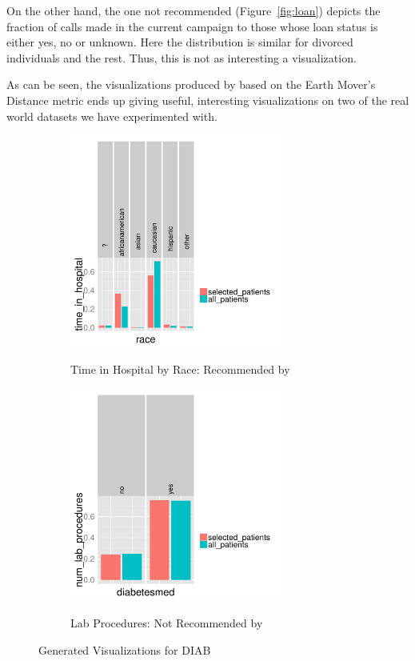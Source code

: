 On the other hand, the one not recommended (Figure~\ref{fig:loan})
depicts the fraction of calls made in the current campaign to those
whose loan status is either yes, no or unknown. 
Here the distribution is similar for divorced individuals and the rest.
Thus, this is not as interesting a visualization.

As can be seen, 
the visualizations produced by \SeeDB based on the Earth Mover's Distance
metric ends up giving useful, interesting visualizations on two of
the real world datasets we have experimented with.



\begin{figure}[h] 
\centering
\begin{subfigure}{\linewidth}
\centering
{\includegraphics[width=7cm] {Images/seedb_dim_race_measure_time_in_hospital.pdf}}
\caption{Time in Hospital by Race: Recommended by \SeeDB}
\label{fig:time-in-hospital}
\end{subfigure}
\begin{subfigure}{\linewidth}
\centering
{\includegraphics[width=7cm] {Images/seedb_dim_diabetesmed_measure_num_lab_procedures.pdf}}
\caption{Lab Procedures: Not Recommended by \SeeDB}
\label{fig:lab-procedures}
\end{subfigure}
\vspace{-10pt}
\caption{\SeeDB Generated Visualizations for DIAB}\label{fig:qual-study}
\vspace{-10pt}
\end{figure}


